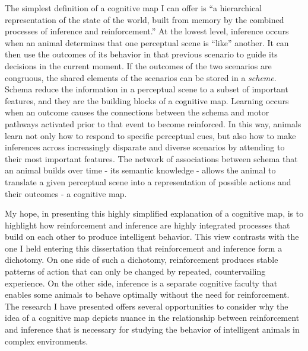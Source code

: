 \documentclass[twoside,12pt,final]{ucthesis-CA2012}
\begin{document}
\begin{ucmainmatter}
The simplest definition of a cognitive map I can offer is ``a hierarchical representation of the state of the world, built from memory by the combined processes of inference and reinforcement.'' At the lowest level, inference occurs when an animal determines that one perceptual scene is ``like'' another. It can then use the outcomes of its behavior in that previous scenario to guide its decisions in the current moment. If the outcomes of the two scenarios are congruous, the shared elements of the scenarios can be stored in a \emph{scheme}. Schema reduce the information in a perceptual scene to a subset of important features, and they are the building blocks of a cognitive map. Learning occurs when an outcome causes the connections between the schema and motor pathways activated prior to that event to become reinforced. In this way, animals learn not only how to respond to specific perceptual cues, but also how to make inferences across increasingly disparate and diverse scenarios by attending to their most important features. The network of associations between schema that an animal builds over time - its semantic knowledge - allows the animal to translate a given perceptual scene into a representation of possible actions and their outcomes - a cognitive map.

My hope, in presenting this highly simplified explanation of a cognitive map, is to highlight how reinforcement and inference are highly integrated processes that build on each other to produce intelligent behavior. This view contrasts with the one I held entering this dissertation that reinforcement and inference form a dichotomy. On one side of such a dichotomy, reinforcement produces stable patterns of action that can only be changed by repeated, countervailing experience. On the other side, inference is a separate cognitive faculty that enables some animals to behave optimally without the need for reinforcement. The research I have presented offers several opportunities to consider why the idea of a cognitive map depicts nuance in the relationship between reinforcement and inference that is necessary for studying the behavior of intelligent animals in complex environments.


\end{ucmainmatter}
\end{document}
